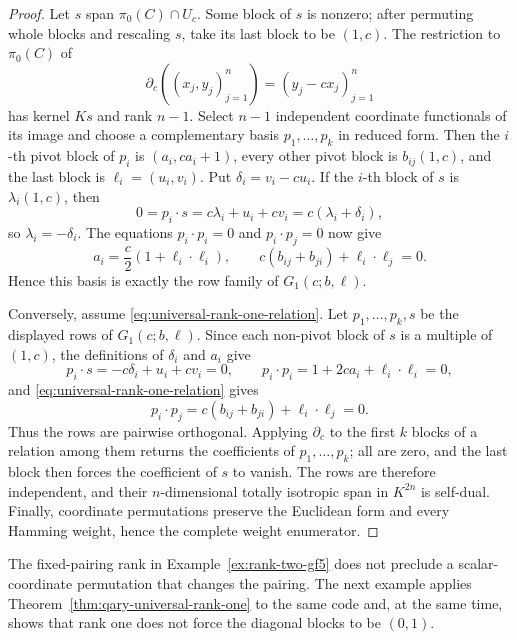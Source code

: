 \documentclass[12pt]{article}
\begin{document}
\begin{proof}
Let \(s\) span \(\pi_0(C)\cap U_c\).  Some block of \(s\) is nonzero;
after permuting whole blocks and rescaling \(s\), take its last block to be
\((1,c)\).  The restriction to \(\pi_0(C)\) of
\[
\partial_c((x_j,y_j)_{j=1}^n)=(y_j-cx_j)_{j=1}^n
\]
has kernel \(Ks\) and rank \(n-1\).  Select \(n-1\) independent coordinate
functionals of its image and choose a complementary basis
\(p_1,\ldots,p_k\) in reduced form.  Then the \(i\)-th pivot block of
\(p_i\) is \((a_i,ca_i+1)\), every other pivot block is
\(b_{ij}(1,c)\), and the last block is \(\ell_i=(u_i,v_i)\).  Put
\(\delta_i=v_i-cu_i\).  If the \(i\)-th block of \(s\) is
\(\lambda_i(1,c)\), then
\[
0=p_i\cdot s=c\lambda_i+u_i+cv_i
=c(\lambda_i+\delta_i),
\]
so \(\lambda_i=-\delta_i\).  The equations \(p_i\cdot p_i=0\) and
\(p_i\cdot p_j=0\) now give
\[
a_i=\frac c2(1+\ell_i\cdot\ell_i),
\qquad
c(b_{ij}+b_{ji})+\ell_i\cdot\ell_j=0.
\]
Hence this basis is exactly the row family of \(G_1(c;b,\ell)\).

Conversely, assume \eqref{eq:universal-rank-one-relation}.  Let
\(p_1,\ldots,p_k,s\) be the displayed rows of \(G_1(c;b,\ell)\).  Since
each non-pivot block of \(s\) is a multiple of \((1,c)\), the definitions of
\(\delta_i\) and \(a_i\) give
\[
p_i\cdot s=-c\delta_i+u_i+cv_i=0,
\qquad
p_i\cdot p_i=1+2ca_i+\ell_i\cdot\ell_i=0,
\]
and \eqref{eq:universal-rank-one-relation} gives
\[
p_i\cdot p_j=c(b_{ij}+b_{ji})+\ell_i\cdot\ell_j=0.
\]
Thus the rows are pairwise orthogonal.  Applying \(\partial_c\) to the
first \(k\) blocks of a relation among them returns the coefficients of
\(p_1,\ldots,p_k\); all are zero, and the last block then forces the
coefficient of \(s\) to vanish.  The rows are therefore independent, and
their \(n\)-dimensional totally isotropic span in \(K^{2n}\) is self-dual.
Finally, coordinate permutations preserve the Euclidean form and every
Hamming weight, hence the complete weight enumerator.
\end{proof}

The fixed-pairing rank in Example~\ref{ex:rank-two-gf5} does not preclude a
scalar-coordinate permutation that changes the pairing. The next example
applies Theorem~\ref{thm:qary-universal-rank-one} to the same code and, at
the same time, shows that rank one does not force the diagonal blocks to be
\((0,1)\).
\end{document}
